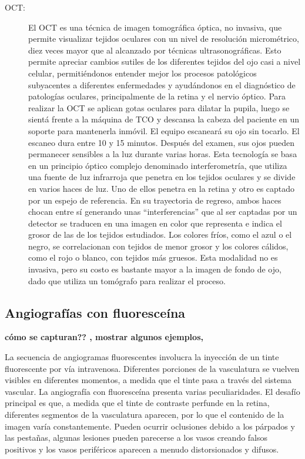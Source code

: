 \begin{description}
\item[OCT:] El OCT es una técnica de imagen tomográfica óptica, no invasiva, que permite visualizar tejidos oculares con un nivel de resolución micrométrico, diez veces mayor que al alcanzado por técnicas ultrasonográficas. Esto permite apreciar cambios sutiles de los diferentes tejidos del ojo casi a nivel celular, permitiéndonos entender mejor los procesos patológicos subyacentes a diferentes enfermedades y ayudándonos en el diagnóstico de patologías oculares, principalmente de la retina y el nervio óptico. Para realizar la OCT se aplican  gotas oculares para dilatar la pupila, luego se sientá frente a la máquina de TCO y descansa  la cabeza del paciente en un soporte para mantenerla inmóvil. El equipo escaneará su ojo sin tocarlo. El escaneo dura entre 10 y 15 minutos. Después del examen, sus ojos pueden permanecer sensibles a la luz durante varias horas. Esta tecnología se basa en un principio óptico complejo denominado interferometría, que utiliza una fuente de luz infrarroja que penetra en los tejidos oculares y se divide en varios haces de luz. Uno de ellos penetra en la retina y otro es captado por un espejo de referencia. En su trayectoria de regreso, ambos haces chocan entre sí generando unas “interferencias” que al ser captadas por un detector se traducen en una imagen en color que representa e indica el grosor de las de los tejidos estudiados. Los colores fríos, como el azul o el negro, se correlacionan con tejidos de menor grosor y los colores cálidos, como el rojo o blanco, con tejidos más gruesos.
Esta modalidad no es invasiva, pero su costo es bastante mayor a la imagen de fondo de ojo, dado que utiliza un tomógrafo para realizar el proceso.
\end{description}

	\subsection{Angiograf\'ias con fluoresce\'ina}


{\textbf{cómo se capturan?? , mostrar algunos ejemplos,}}

	La secuencia de angiogramas fluorescentes involucra la inyección de un tinte fluorescente por vía intravenosa. Diferentes porciones de la vasculatura se vuelven visibles en diferentes momentos, a medida que el tinte pasa a través del sistema vascular.
La angiografía con fluoresceína presenta varias peculiaridades. El desafío principal es que, a medida que el tinte de contraste  perfunde en la retina, diferentes segmentos de la vasculatura aparecen, por lo que el contenido de la imagen varía constantemente.
Pueden ocurrir oclusiones debido a los párpados y las pestañas, algunas lesiones pueden parecerse a los vasos creando falsos positivos y los vasos periféricos aparecen a menudo distorsionados y difusos. \cite{perez2011improving}

